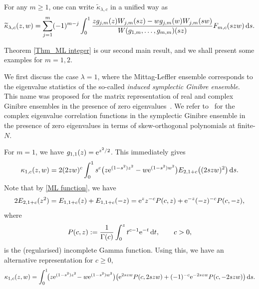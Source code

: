 \documentclass[pdftex]{sigma}
\numberwithin{equation}{section}
\newcommand{\1}{\chi}
\begin{document}
\begin{Remark}
	For any $m \ge 1$, one can write $	\widetilde{\kappa}_{\lambda,c}$ in a unified way as
	\begin{gather*}
	\widetilde{\kappa}_{\lambda,c}(z,w)= \sum_{j=1}^{m} (-1)^{m-j} \int_0^1 \frac{ z g_{j,m}(z)W_{j,m}(sz)-w g_{j,m}(w)W_{j,m}(sw) }{ W(g_{1,m},\dots,g_{m,m})(sz) } F_{m,c}(szw)\,{\rm d}s.
	\end{gather*}
\end{Remark}

Theorem \ref{Thm_ML integer} is our second main result, and we shall present some examples for $m=1,2$.

\begin{Example}[$\lambda=1$]
	We first discuss the case $\lambda=1$, where the Mittag-Leffler ensemble corresponds to the eigenvalue statistics of the so-called \emph{induced symplectic Ginibre ensemble}. This name was proposed for the matrix representation of real and complex Ginibre ensembles in the presence of zero eigenvalues~\cite{MR2881072}.
	We refer to~\cite{MR2180006} for the complex eigenvalue correlation functions in the symplectic Ginibre ensemble in the presence of zero eigenvalues in terms of skew-orthogonal polynomials at finite-$N$.
	
	For $m=1$, we have $g_{1,1}(z)={\rm e}^{z^2/2}$.
	This immediately gives
	\begin{gather} \label{kappa c alt2}
		\kappa_{1,c}(z,w)= 2 (2zw)^c \int_0^1 s^c \big(z{\rm e}^{(1-s^2)z^2}-w{\rm e}^{(1-s^2)w^2}\big) E_{2,1+c}\big((2szw)^2\big)\,{\rm d}s. 	
	\end{gather}
	Note that by \eqref{ML function}, we have
	\begin{gather*}
		2 E_{2,1+c}(z^2) = E_{1,1+c}(z)+E_{1,1+c}(-z)
		={\rm e}^z z^{-c} P(c,z)+{\rm e}^{-z} (-z)^{-c} P(c,-z),
	\end{gather*}
	where
	\begin{gather*}
		P(c,z):=\frac{1}{\Gamma(c)}\int_{0}^{z} t^{c-1} {\rm e}^{-t} \, {\rm d}t, \qquad c>0,
	\end{gather*}
	is the (regularised) incomplete Gamma function. Using this, we have an alternative representation for $c\ge 0$,
	\begin{gather*}
	\kappa_{1,c}(z,w)= \int_0^1\!\! \big(z{\rm e}^{(1-s^2)z^2}\!-w{\rm e}^{(1-s^2)w^2}\big)\big( {\rm e}^{2szw} P(c,2szw)+(-1)^{-c} {\rm e}^{-2szw} P(c,-2szw) \big)\,{\rm d}s.
	\end{gather*}
	

\end{Example}
\end{document}
